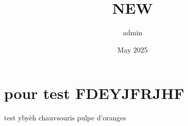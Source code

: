 \documentclass{article}
\title{NEW}
\author{admin }
\date{May 2025}
\begin{document}
\maketitle

\section{ pour test FDEYJFRJHF}
test ybyèh
chauvsouris
pulpe d'oranges 
\end{document}
